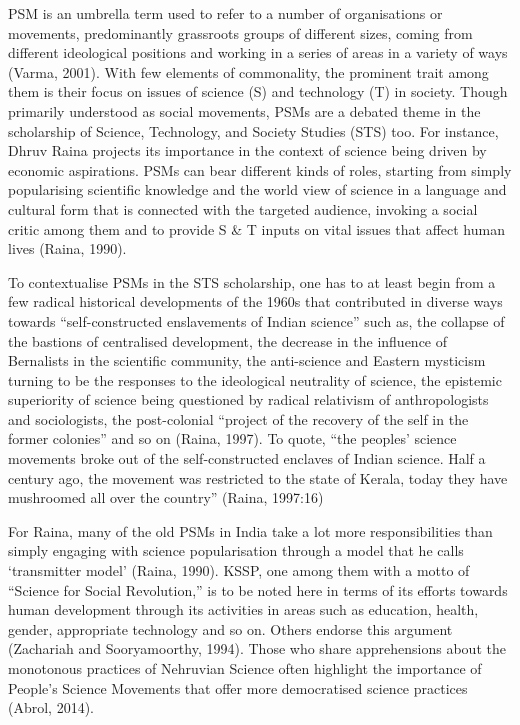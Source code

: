 \documentclass[twoside, 13pt]{article}
\begin{document}
{\fontsize{12}{14}\selectfont PSM is an umbrella term used to refer to a number of organisations or movements, predominantly grassroots groups of different sizes, coming from different ideological positions and working in a series of areas in a variety of ways (Varma, 2001). With few elements of commonality, the prominent trait among them is their focus on issues of science (S) and technology (T) in society. Though primarily understood as social movements, PSMs are a debated theme in the scholarship of Science, Technology, and Society Studies (STS) too. For instance, Dhruv Raina projects its importance in the context of science being driven by economic aspirations. PSMs can bear different kinds of roles, starting from simply popularising scientific knowledge and the world view of science in a language and cultural form that is connected with the targeted audience, invoking a social critic among them and to provide S \& T inputs on vital issues that affect human lives (Raina, 1990). 

To contextualise PSMs in the STS scholarship, one has to at least begin from a few radical historical developments of the 1960s that contributed in diverse ways towards “self-constructed enslavements of Indian science” such as, the collapse of the bastions of centralised development, the decrease in the influence of Bernalists in the scientific community, the anti-science and Eastern mysticism turning to be the responses to the ideological neutrality of science, the epistemic superiority of science being questioned by radical relativism of anthropologists and sociologists, the post-colonial “project of the recovery of the self in the former colonies” and so on (Raina, 1997). To quote, “the peoples' science movements broke out of the self-constructed enclaves of Indian science. Half a century ago, the movement was restricted to the state of Kerala, today they have mushroomed all over the country” (Raina, 1997:16)


For Raina, many of the old PSMs in India take a lot more responsibilities than simply engaging with science popularisation through a model that he calls ‘transmitter model’ (Raina, 1990). KSSP, one among them with a motto of “Science for Social Revolution,” is to be noted here in terms of its efforts towards human development through its activities in areas such as education, health, gender, appropriate technology and so on. Others endorse this argument (Zachariah and Sooryamoorthy, 1994). Those who share apprehensions about the monotonous practices of Nehruvian Science often highlight the importance of People’s Science Movements that offer more democratised science practices (Abrol, 2014).

}
\end{document}
